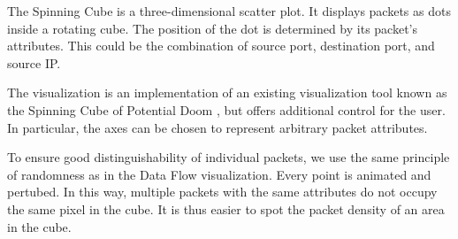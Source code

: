 The Spinning Cube is a three-dimensional scatter plot. It displays packets as dots inside a rotating cube. The position of the dot is determined by its packet's attributes. This could be the combination of source port, destination port, and source IP. 

The visualization is an implementation of an existing visualization tool known as the Spinning Cube of Potential Doom \cite{lau2004spinning}, but offers additional control for the user. In particular, the axes can be chosen to represent arbitrary packet attributes.

To ensure good distinguishability of individual packets, we use the same principle of randomness as in the Data Flow visualization. Every point is animated and pertubed. In this way, multiple packets with the same attributes do not occupy the same pixel in the cube. It is thus easier to spot the packet density of an area in the cube.